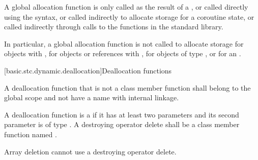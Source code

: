 \pnum
A global allocation function is only called as the result of a , or called directly using the 
syntax, or called indirectly to allocate storage for
a coroutine state,
or called indirectly through calls to the
functions in the \Cpp{} standard library.
\begin{note}
In particular, a
global allocation function is not called to allocate storage for objects
with , for objects or references
with , for objects of
type , or for an
.
\end{note}

[basic.stc.dynamic.deallocation]{Deallocation functions}

\pnum
{}%
A deallocation function that is not a class member function
shall belong to the global scope and not have a name with internal linkage.

\pnum
A deallocation function
is a 
if it has at least two parameters
and its second parameter
is of type .
A destroying operator delete
shall be a class member function named .
\begin{note}
Array deletion cannot use a destroying operator delete.
\end{note}

